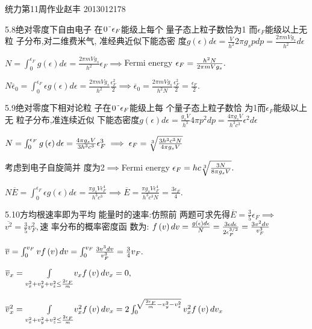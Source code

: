 \documentclass{ctexart}
\begin{document}
统力第11周作业\qquad 赵丰%
2013012178\bigskip 

5.8绝对零度下自由电子%
在$0\symbol{126}\epsilon _{F}$能级上每个%
量子态上粒子数恰为1%
而$\epsilon _{F}$能级以上无粒%
子分布,对二维费米气,%
准经典近似下能态密%
度$g\left( \epsilon \right) d\epsilon =\frac{V}{h^{2}}2\pi g_{s}pdp=%
\frac{2\pi mVg_{s}}{h^{2}}d\epsilon $

$N=\int_{0}^{\epsilon _{F}}g\left( \epsilon \right) d\epsilon =\frac{2\pi
mVg_{s}}{h^{2}}\epsilon _{F}\implies $Fermi energy $\epsilon _{F}=\frac{%
h^{2}N}{2\pi mVg_{s}}.$

$N\overline{\epsilon }_{0}=\int_{0}^{\epsilon _{F}}\epsilon g\left( \epsilon
\right) d\epsilon =\frac{2\pi mVg_{s}}{h^{2}}\frac{\epsilon _{F}^{2}}{2}%
\implies \overline{\epsilon }_{0}=\frac{2\pi mVg_{s}}{h^{2}N}\frac{\epsilon
_{F}^{2}}{2}=\frac{\epsilon _{F}}{2}.$

5.9绝对零度下相对论粒%
子在$0\symbol{126}\epsilon _{F}$能级上每%
个量子态上粒子数恰%
为1而$\epsilon _{F}$能级以上无%
粒子分布,准连续近似%
下能态密度$g\left( \epsilon \right) d\epsilon =%
\frac{g_{s}V}{h^{3}}4\pi p^{2}dp=\frac{4\pi g_{s}V}{h^{3}c^{3}}\epsilon
^{2}d\epsilon $

$N=\int_{0}^{\epsilon _{F}}g\left( \epsilon \right) d\epsilon =\frac{4\pi
g_{s}V}{3h^{3}c^{3}}\epsilon _{F}^{3}\implies \epsilon _{F}=\sqrt[3]{\frac{%
3h^{3}c^{3}N}{4\pi g_{s}V}}$

考虑到电子自旋简并%
度为2$\implies $Fermi energy $\epsilon _{F}=hc\sqrt[3]{\frac{3N}{%
8\pi g_{s}V}}.$

$N\overline{E}=\int_{0}^{\epsilon _{F}}\epsilon g\left( \epsilon \right)
d\epsilon =\frac{\pi g_{s}V\epsilon _{F}^{4}}{h^{3}c^{3}}\implies \overline{E%
}=\frac{\pi g_{s}V\epsilon _{F}^{4}}{h^{3}c^{3}N}=\frac{3\epsilon _{F}}{4}.$

5.10方均根速率即为平均%
能量时的速率:仿照前%
两题可求先得$\overline{E}=\frac{3}{5}%
\epsilon _{F}\implies $ $\overline{v^{2}}=\frac{3}{5}v_{F}^{2},$速%
率分布的概率密度函%
数为: $f\left( v\right) dv=\frac{g\left( \epsilon \right)
d\epsilon }{N}=\frac{3\epsilon d\epsilon }{2\epsilon _{F}^{3/2}}=\frac{%
3v^{2}dv}{v_{F}^{3}}$

$\overline{v}=\int_{0}^{v_{F}}vf\left( v\right) dv=\int_{0}^{v_{F}}\frac{%
3v^{3}dv}{v_{F}^{3}}=\frac{3}{4}v_{F}.$

$\overline{v}_{x}=\underset{v_{x}^{2}+v_{y}^{2}+v_{z}^{2}\leq \frac{%
2\epsilon _{F}}{m}}{\int }v_{x}f\left( v\right) dv_{x}=0,$

$\overline{v}_{x}^{2}=\underset{v_{x}^{2}+v_{y}^{2}+v_{z}^{2}\leq \frac{%
2\epsilon _{F}}{m}}{\int }v_{x}^{2}f\left( v\right) dv_{x}=2\int_{0}^{\sqrt{%
\frac{2\epsilon _{F}}{m}-v_{y}^{2}-v_{z}^{2}}}v_{x}^{2}f\left( v\right)
dv_{x}$
\end{document}
